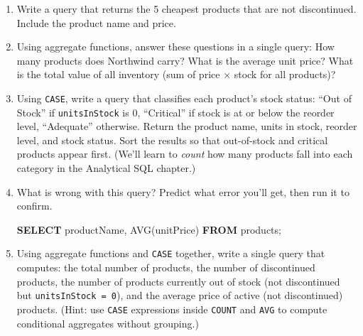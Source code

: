 \documentclass[
  letterpaper,
  DIV=11,
  numbers=noendperiod]{scrreprt}
\newenvironment{Shaded}{\begin{snugshade}}{\end{snugshade}}
\newcommand{\FunctionTok}[1]{\textcolor[rgb]{0.28,0.35,0.67}{#1}}
\newcommand{\KeywordTok}[1]{\textcolor[rgb]{0.00,0.23,0.31}{\textbf{#1}}}
\newcommand{\NormalTok}[1]{\textcolor[rgb]{0.00,0.23,0.31}{#1}}
\begin{document}
\begin{tcolorbox}[enhanced jigsaw, opacitybacktitle=0.6, arc=.35mm, colback=white, bottomtitle=1mm, opacityback=0, toprule=.15mm, left=2mm, colbacktitle=quarto-callout-note-color!10!white, breakable, coltitle=black, toptitle=1mm, colframe=quarto-callout-note-color-frame, bottomrule=.15mm, titlerule=0mm, title=\textcolor{quarto-callout-note-color}{\faInfo}\hspace{0.5em}{Exercises}, rightrule=.15mm, leftrule=.75mm]

\begin{enumerate}
\def\labelenumi{\arabic{enumi}.}
\item
  Write a query that returns the 5 cheapest products that are not
  discontinued. Include the product name and price.
\item
  Using aggregate functions, answer these questions in a single query:
  How many products does Northwind carry? What is the average unit
  price? What is the total value of all inventory (sum of price × stock
  for all products)?
\item
  Using \texttt{CASE}, write a query that classifies each product's
  stock status: ``Out of Stock'' if \texttt{unitsInStock} is 0,
  ``Critical'' if stock is at or below the reorder level, ``Adequate''
  otherwise. Return the product name, units in stock, reorder level, and
  stock status. Sort the results so that out-of-stock and critical
  products appear first. (We'll learn to \emph{count} how many products
  fall into each category in the Analytical SQL chapter.)
\item
  What is wrong with this query? Predict what error you'll get, then run
  it to confirm.

  \begin{codelisting}

  \caption{\texttt{duckdb}}

\begin{Shaded}
\begin{Highlighting}[]
\KeywordTok{SELECT}
\NormalTok{    productName,}
    \FunctionTok{AVG}\NormalTok{(unitPrice)}
\KeywordTok{FROM}\NormalTok{ products;}
\end{Highlighting}
\end{Shaded}

  \end{codelisting}
\item
  Using aggregate functions and \texttt{CASE} together, write a single
  query that computes: the total number of products, the number of
  discontinued products, the number of products currently out of stock
  (not discontinued but \texttt{unitsInStock\ =\ 0}), and the average
  price of active (not discontinued) products. (Hint: use \texttt{CASE}
  expressions inside \texttt{COUNT} and \texttt{AVG} to compute
  conditional aggregates without grouping.)
\end{enumerate}

\end{tcolorbox}
\end{document}
